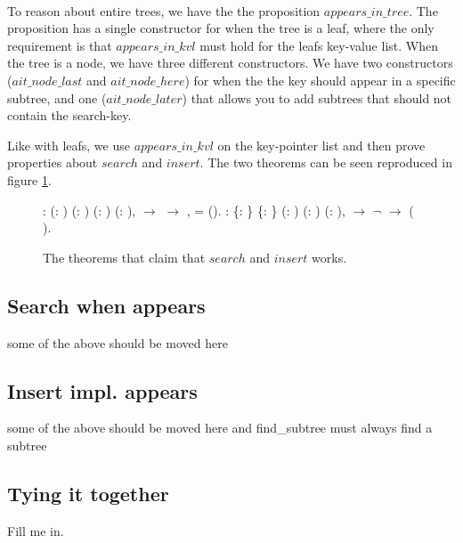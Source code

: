 \paragraph{}
To reason about entire trees, we have the the proposition $appears\_in\_tree$. The proposition has a single constructor for when the tree is a leaf, where the only requirement is that $appears\_in\_kvl$ must hold for the leafs key-value list. When the tree is a node, we have three different constructors. We have two constructors ($ait\_node\_last$ and $ait\_node\_here$) for when the the key should appear in a specific subtree, and one ($ait\_node\_later$) that allows you to add subtrees that should not contain the search-key.

Like with leafs, we use $appears\_in\_kvl$ on the key-pointer list and then prove properties about $search$ and $insert$. The two theorems can be seen reproduced in figure \ref{fig:search_and_insert_works}.


\begin{figure}
  \begin{coqdoccode}
  \coqdocnoindent
    : \coqdockw{\ensuremath{\forall}} (: ) (: ) (:   ) (: ),\coqdoceol
  \coqdocindent{1.00em}
      \ensuremath{\rightarrow} \coqdoceol
  \coqdocindent{1.00em}
     \ensuremath{\rightarrow} \coqdoceol
  \coqdocindent{1.00em}
  \coqdocvar{\ensuremath{\exists}} ,    = ().\coqdoceol
  \coqdocemptyline
  \coqdocnoindent
    : \coqdockw{\ensuremath{\forall}} \{: \} \{: \} (:   ) (: ) (: ),\coqdoceol
  \coqdocindent{1.00em}
      \ensuremath{\rightarrow} \coqdoceol
  \coqdocindent{1.00em}
  \ensuremath{\lnot}   \ensuremath{\rightarrow} \coqdoceol
  \coqdocindent{1.00em}
    (   ).\coqdoceol
  \coqdocemptyline
  \end{coqdoccode}
  \caption{The theorems that claim that $search$ and $insert$ works.}
  \label{fig:search_and_insert_works}
\end{figure}


\subsection{Search when appears}
some of the above should be moved here

\subsection{Insert impl. appears}
some of the above should be moved here and find\_subtree must always find a subtree

\subsection{Tying it together}
Fill me in.
